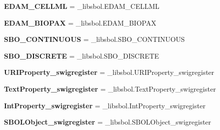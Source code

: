 \begin{DoxyCompactItemize}
\item 
{\bfseries E\+D\+A\+M\+\_\+\+C\+E\+L\+L\+ML} = \+\_\+libsbol.\+E\+D\+A\+M\+\_\+\+C\+E\+L\+L\+ML\hypertarget{namespacesbol_1_1libsbol_a85199c040458f0cb4996d15d65649292}{}\label{namespacesbol_1_1libsbol_a85199c040458f0cb4996d15d65649292}

\item 
{\bfseries E\+D\+A\+M\+\_\+\+B\+I\+O\+P\+AX} = \+\_\+libsbol.\+E\+D\+A\+M\+\_\+\+B\+I\+O\+P\+AX\hypertarget{namespacesbol_1_1libsbol_aa4107f9bb8adf688f81d23be588650ae}{}\label{namespacesbol_1_1libsbol_aa4107f9bb8adf688f81d23be588650ae}

\item 
{\bfseries S\+B\+O\+\_\+\+C\+O\+N\+T\+I\+N\+U\+O\+US} = \+\_\+libsbol.\+S\+B\+O\+\_\+\+C\+O\+N\+T\+I\+N\+U\+O\+US\hypertarget{namespacesbol_1_1libsbol_a5c6c67d3ed62a37ff0d3ff96841ef9c5}{}\label{namespacesbol_1_1libsbol_a5c6c67d3ed62a37ff0d3ff96841ef9c5}

\item 
{\bfseries S\+B\+O\+\_\+\+D\+I\+S\+C\+R\+E\+TE} = \+\_\+libsbol.\+S\+B\+O\+\_\+\+D\+I\+S\+C\+R\+E\+TE\hypertarget{namespacesbol_1_1libsbol_ae0622b75b8d199b459e61820cecf51e8}{}\label{namespacesbol_1_1libsbol_ae0622b75b8d199b459e61820cecf51e8}

\item 
{\bfseries U\+R\+I\+Property\+\_\+swigregister} = \+\_\+libsbol.\+U\+R\+I\+Property\+\_\+swigregister\hypertarget{namespacesbol_1_1libsbol_aa804310248a20fc602494758993ae67f}{}\label{namespacesbol_1_1libsbol_aa804310248a20fc602494758993ae67f}

\item 
{\bfseries Text\+Property\+\_\+swigregister} = \+\_\+libsbol.\+Text\+Property\+\_\+swigregister\hypertarget{namespacesbol_1_1libsbol_a55708108588bada260de4a41f0ae9ebe}{}\label{namespacesbol_1_1libsbol_a55708108588bada260de4a41f0ae9ebe}

\item 
{\bfseries Int\+Property\+\_\+swigregister} = \+\_\+libsbol.\+Int\+Property\+\_\+swigregister\hypertarget{namespacesbol_1_1libsbol_a56e5c77254781d8a5cd36184729d703b}{}\label{namespacesbol_1_1libsbol_a56e5c77254781d8a5cd36184729d703b}

\item 
{\bfseries S\+B\+O\+L\+Object\+\_\+swigregister} = \+\_\+libsbol.\+S\+B\+O\+L\+Object\+\_\+swigregister\hypertarget{namespacesbol_1_1libsbol_a4835ce93951fc278b0062576050bbc98}{}\label{namespacesbol_1_1libsbol_a4835ce93951fc278b0062576050bbc98}


\end{DoxyCompactItemize}
